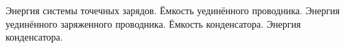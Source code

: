\documentclass[__main__.tex]{subfiles}
\begin{document}
Энергия системы точечных зарядов. Ёмкость уединённого проводника. Энергия уединённого заряженного проводника. Ёмкость конденсатора. Энергия конденсатора.\\ 

\end{document}
